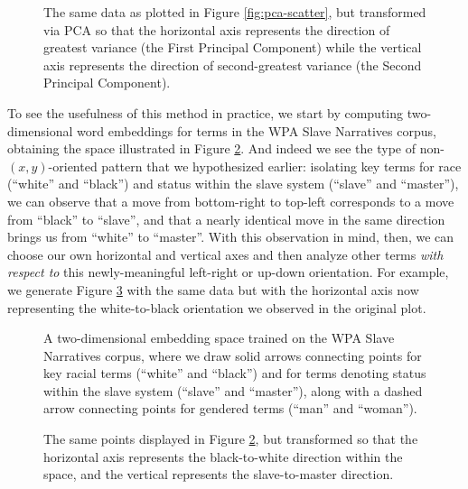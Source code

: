 \documentclass[11pt]{article}
\begin{document}
\begin{figure}
\centering

\caption{The same data as plotted in Figure \ref{fig:pca-scatter}, but transformed via PCA so that the horizontal axis represents the direction of greatest variance (the First Principal Component) while the vertical axis represents the direction of second-greatest variance (the Second Principal Component).}
\label{fig:pca-scatter-transformed}
\end{figure}

To see the usefulness of this method in practice, we start by computing two-dimensional word embeddings for terms in the WPA Slave Narratives corpus, obtaining the space illustrated in Figure \ref{fig:wpa-embeddings}. And indeed we see the type of non-$(x,y)$-oriented pattern that we hypothesized earlier: isolating key terms for race (``white'' and ``black'') and status within the slave system (``slave'' and ``master''), we can observe that a move from bottom-right to top-left corresponds to a move from ``black'' to ``slave'', and that a nearly identical move in the same direction brings us from ``white'' to ``master''. With this observation in mind, then, we can choose our own horizontal and vertical axes and then analyze other terms \textit{with respect to} this newly-meaningful left-right or up-down orientation. For example, we generate Figure \ref{fig:wpa-embeddings-transformed} with the same data but with the horizontal axis now representing the white-to-black orientation we observed in the original plot.

\begin{figure}[ht!]
	\centering
	
	\caption{A two-dimensional embedding space trained on the WPA Slave Narratives corpus, where we draw solid arrows connecting points for key racial terms (``white'' and ``black'') and for terms denoting status within the slave system (``slave'' and ``master''), along with a dashed arrow connecting points for gendered terms (``man'' and ``woman'').}
	\label{fig:wpa-embeddings}
\end{figure}

\begin{figure}[ht!]
\centering

\caption{The same points displayed in Figure \ref{fig:wpa-embeddings}, but transformed so that the horizontal axis represents the black-to-white direction within the space, and the vertical represents the slave-to-master direction.}
\label{fig:wpa-embeddings-transformed}
\end{figure}
\end{document}
